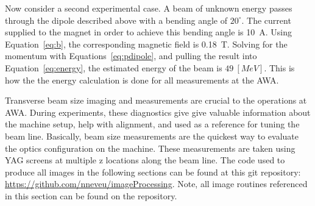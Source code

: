 Now consider a second experimental case.
A beam of unknown energy passes through the dipole described above
with a bending angle of $20^\circ$. 
The current supplied to the magnet in order to achieve this bending angle is \SI{10}{A}.
Using Equation~\ref{eq:b}, the corresponding magnetic field is \SI{0.18}{T}.
Solving for the momentum with Equations~\ref{eq:pdipole}, and pulling the 
result into Equation~\ref{eq:energy}, 
the estimated energy of the beam is $\SI{49}{[MeV]}$.
This is how the the energy calculation is done for all measurements at the AWA.


 \label{sec:beamsize}

Transverse beam size imaging and measurements are crucial to the 
operations at AWA. During experiments, these diagnostics give 
give valuable information about the machine setup, help with alignment, 
and  used as a reference for tuning the beam line.
Basically, beam size measurements are the quickest way to evaluate the
optics configuration on the machine. 
These measurements are taken using YAG screens at multiple z locations along the beam line.
The code used to produce all images in the following sections can be found at this git repository: 
\url{https://github.com/nneveu/imageProcessing}.
Note, all image routines referenced in this section can be found on the repository.

